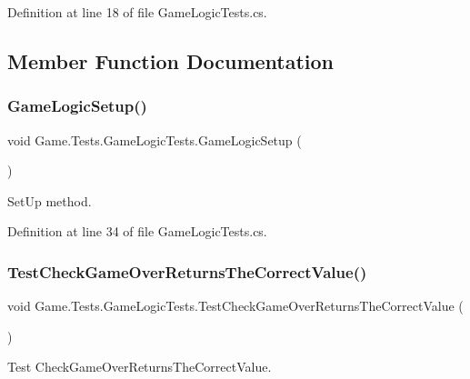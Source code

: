 Definition at line 18 of file Game\+Logic\+Tests.\+cs.



\subsection{Member Function Documentation}
\mbox{\label{class_game_1_1_tests_1_1_game_logic_tests_a61fea100641f1e24608112d1d6a8f18b}} 
\subsubsection{\texorpdfstring{GameLogicSetup()}{GameLogicSetup()}}
{\footnotesize\ttfamily void Game.\+Tests.\+Game\+Logic\+Tests.\+Game\+Logic\+Setup (\begin{DoxyParamCaption}{ }\end{DoxyParamCaption})}



Set\+Up method. 



Definition at line 34 of file Game\+Logic\+Tests.\+cs.

\mbox{\label{class_game_1_1_tests_1_1_game_logic_tests_a3fa73a274c2ac7865db08e69d1869ae1}} 
\subsubsection{\texorpdfstring{TestCheckGameOverReturnsTheCorrectValue()}{TestCheckGameOverReturnsTheCorrectValue()}}
{\footnotesize\ttfamily void Game.\+Tests.\+Game\+Logic\+Tests.\+Test\+Check\+Game\+Over\+Returns\+The\+Correct\+Value (\begin{DoxyParamCaption}{ }\end{DoxyParamCaption})}



Test Check\+Game\+Over\+Returns\+The\+Correct\+Value. 



